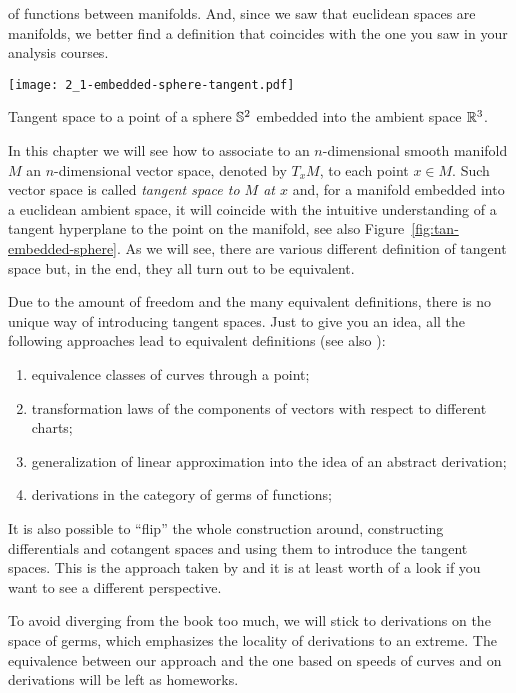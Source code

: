
 of functions between manifolds.
And, since we saw that euclidean spaces are manifolds, we better find a definition that coincides with the one you saw in your analysis courses.

\begin{marginfigure}[7em]
  \texttt{[image: 2\_1-embedded-sphere-tangent.pdf]}
  \label{fig:tan-embedded-sphere}
  \caption{Tangent space to a point of a sphere $\mathbb{S}^2$ embedded into the ambient space $\mathbb{R}^3$.}
\end{marginfigure}
In this chapter we will see how to associate to an $n$-dimensional smooth manifold $M$ an $n$-dimensional vector space, denoted by $T_x M$, to each point $x\in M$.
Such vector space is called \emph{tangent space to $M$ at $x$} and, for a manifold embedded into a euclidean ambient space, it will coincide with the intuitive understanding of a tangent hyperplane to the point on the manifold, see also Figure~\ref{fig:tan-embedded-sphere}.
As we will see, there are various different definition of tangent space but, in the end, they all turn out to be equivalent.

Due to the amount of freedom and the many equivalent definitions, there is no unique way of introducing tangent spaces.
Just to give you an idea, all the following approaches lead to equivalent definitions (see also \cite{book:lee}):
\begin{enumerate}
  \item equivalence classes of curves through a point;
  \item transformation laws of the components of vectors with respect to different charts;
  \item generalization of linear approximation into the idea of an abstract derivation;
  \item derivations in the category of germs of functions;
\end{enumerate}

It is also possible to ``flip'' the whole construction around, constructing differentials and cotangent spaces and using them to introduce the tangent spaces.
This is the approach taken by \cite{lectures:hitchin} and it is at least worth of a look if you want to see a different perspective.

To avoid diverging from the book too much, we will stick to derivations on the space of germs, which emphasizes the locality of derivations to an extreme.
The equivalence between our approach and the one based on speeds of curves and on derivations will be left as homeworks.

